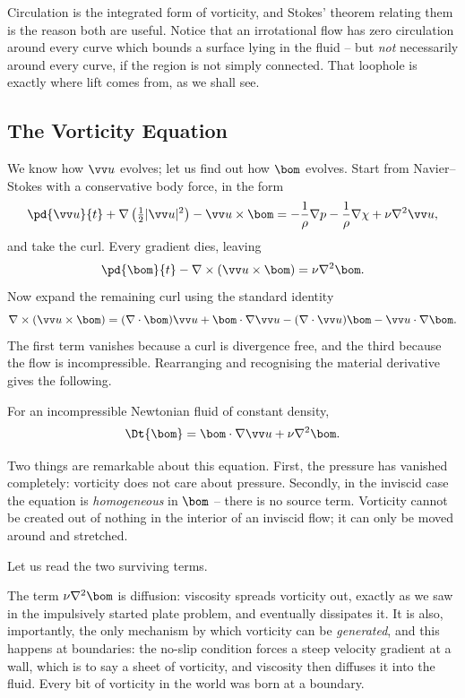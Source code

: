 Circulation is the integrated form of vorticity, and Stokes' theorem relating them is the reason both are useful. Notice that an irrotational flow has zero circulation around every curve which bounds a surface lying in the fluid -- but \emph{not} necessarily around every curve, if the region is not simply connected. That loophole is exactly where lift comes from, as we shall see.

\subsection{The Vorticity Equation}

We know how $\vv u$ evolves; let us find out how $\bom$ evolves. Start from Navier--Stokes with a conservative body force, in the form
$$
\pd{\vv u}{t} + \nabla\left(\tfrac{1}{2}|\vv u|^2\right) - \vv u \times \bom = -\frac{1}{\rho}\nabla p - \frac{1}{\rho}\nabla \chi + \nu \nabla^2 \vv u,
$$
and take the curl. Every gradient dies, leaving
$$
\pd{\bom}{t} - \nabla \times (\vv u \times \bom) = \nu \nabla^2 \bom.
$$
Now expand the remaining curl using the standard identity
$$
\nabla \times (\vv u \times \bom) = (\nabla \cdot \bom)\vv u + \bom \cdot \nabla \vv u - (\nabla \cdot \vv u)\bom - \vv u \cdot \nabla \bom.
$$
The first term vanishes because a curl is divergence free, and the third because the flow is incompressible. Rearranging and recognising the material derivative gives the following.

\begin{proposition}
	For an incompressible Newtonian fluid of constant density,
	$$
	\Dt{\bom} = \bom \cdot \nabla \vv u + \nu \nabla^2 \bom.
	$$
\end{proposition}

Two things are remarkable about this equation. First, the pressure has vanished completely: vorticity does not care about pressure. Secondly, in the inviscid case the equation is \emph{homogeneous} in $\bom$ -- there is no source term. Vorticity cannot be created out of nothing in the interior of an inviscid flow; it can only be moved around and stretched.

Let us read the two surviving terms.

The term $\nu \nabla^2 \bom$ is diffusion: viscosity spreads vorticity out, exactly as we saw in the impulsively started plate problem, and eventually dissipates it. It is also, importantly, the only mechanism by which vorticity can be \emph{generated}, and this happens at boundaries: the no-slip condition forces a steep velocity gradient at a wall, which is to say a sheet of vorticity, and viscosity then diffuses it into the fluid. Every bit of vorticity in the world was born at a boundary.

